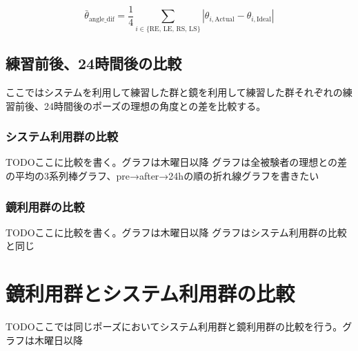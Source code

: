 \[
  \bar{\theta}_{\text{angle\_dif}} = \frac{1}{4} \sum_{i \in \{\text{RE, LE, RS, LS}\}} |\theta_{i, \text{Actual}} - \theta_{i, \text{Ideal}}|
\]

\subsection{練習前後、24時間後の比較}
ここではシステムを利用して練習した群と鏡を利用して練習した群それぞれの練習前後、24時間後のポーズの理想の角度との差を比較する。
\subsubsection{システム利用群の比較}
TODOここに比較を書く。グラフは木曜日以降
グラフは全被験者の理想との差の平均の3系列棒グラフ、pre→after→24hの順の折れ線グラフを書きたい
\subsubsection{鏡利用群の比較}
TODOここに比較を書く。グラフは木曜日以降
グラフはシステム利用群の比較と同じ

\section{鏡利用群とシステム利用群の比較}
TODOここでは同じポーズにおいてシステム利用群と鏡利用群の比較を行う。グラフは木曜日以降


